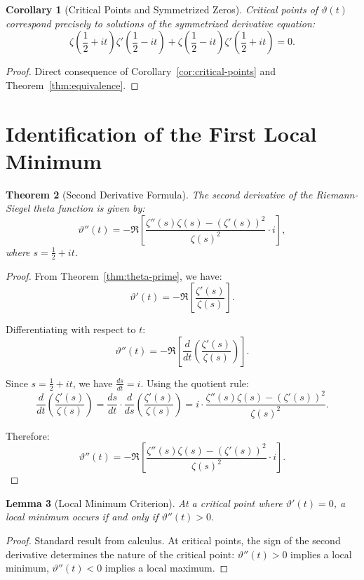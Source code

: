 \documentclass[11pt,a4paper]{article}
\newtheorem{theorem}{Theorem}[section]
\newtheorem{lemma}[theorem]{Lemma}
\newtheorem{corollary}[theorem]{Corollary}
\begin{document}
\begin{corollary}[Critical Points and Symmetrized Zeros]\label{cor:symmetrized-zeros}
Critical points of $\vartheta(t)$ correspond precisely to solutions of the symmetrized derivative equation:
$$\zeta\left(\frac{1}{2} + it\right)\zeta'\left(\frac{1}{2} - it\right) + \zeta\left(\frac{1}{2} - it\right)\zeta'\left(\frac{1}{2} + it\right) = 0.$$
\end{corollary}

\begin{proof}
Direct consequence of Corollary~\ref{cor:critical-points} and Theorem~\ref{thm:equivalence}.
\end{proof}

\section{Identification of the First Local Minimum}

\begin{theorem}[Second Derivative Formula]\label{thm:second-derivative}
The second derivative of the Riemann-Siegel theta function is given by:
$$\vartheta''(t) = -\Re\left[\frac{\zeta''(s)\zeta(s) - (\zeta'(s))^2}{\zeta(s)^2} \cdot i\right],$$
where $s = \frac{1}{2} + it$.
\end{theorem}

\begin{proof}
From Theorem~\ref{thm:theta-prime}, we have:
$$\vartheta'(t) = -\Re\left[\frac{\zeta'(s)}{\zeta(s)}\right].$$

Differentiating with respect to $t$:
$$\vartheta''(t) = -\Re\left[\frac{d}{dt}\left(\frac{\zeta'(s)}{\zeta(s)}\right)\right].$$

Since $s = \frac{1}{2} + it$, we have $\frac{ds}{dt} = i$. Using the quotient rule:
$$\frac{d}{dt}\left(\frac{\zeta'(s)}{\zeta(s)}\right) = \frac{ds}{dt} \cdot \frac{d}{ds}\left(\frac{\zeta'(s)}{\zeta(s)}\right) = i \cdot \frac{\zeta''(s)\zeta(s) - (\zeta'(s))^2}{\zeta(s)^2}.$$

Therefore:
$$\vartheta''(t) = -\Re\left[\frac{\zeta''(s)\zeta(s) - (\zeta'(s))^2}{\zeta(s)^2} \cdot i\right].$$
\end{proof}

\begin{lemma}[Local Minimum Criterion]\label{lem:minimum-criterion}
At a critical point where $\vartheta'(t) = 0$, a local minimum occurs if and only if $\vartheta''(t) > 0$.
\end{lemma}

\begin{proof}
Standard result from calculus. At critical points, the sign of the second derivative determines the nature of the critical point: $\vartheta''(t) > 0$ implies a local minimum, $\vartheta''(t) < 0$ implies a local maximum.
\end{proof}
\end{document}
